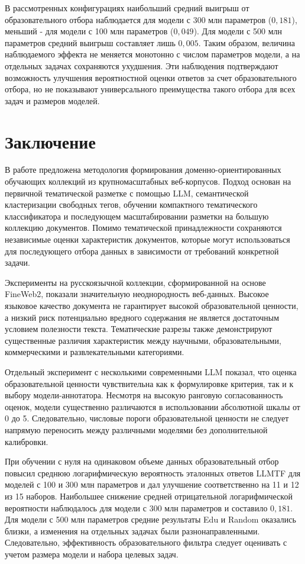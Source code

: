 \documentclass[12pt,a4paper]{article}
\begin{document}
В рассмотренных конфигурациях наибольший средний выигрыш
от образовательного отбора наблюдается для модели с 300 млн параметров
($0{,}181$), меньший - для модели с 100 млн параметров ($0{,}049$).
Для модели с 500 млн параметров средний выигрыш составляет лишь $0{,}005$.
Таким образом, величина наблюдаемого эффекта не меняется монотонно
с числом параметров модели, а на отдельных задачах сохраняются ухудшения.
Эти наблюдения подтверждают возможность улучшения вероятностной оценки
ответов за счет образовательного отбора, но не показывают универсального
преимущества такого отбора для всех задач и размеров моделей.

\section{Заключение}

В работе предложена методология формирования доменно-ориентированных 
обучающих коллекций из крупномасштабных веб-корпусов. Подход основан на 
первичной тематической разметке с помощью LLM, семантической кластеризации 
свободных тегов, обучении компактного тематического классификатора и последующем 
масштабировании разметки на большую коллекцию документов. Помимо тематической 
принадлежности сохраняются независимые оценки характеристик документов, 
которые могут использоваться для последующего отбора данных в зависимости 
от требований конкретной задачи.

Эксперименты на русскоязычной коллекции, сформированной на основе FineWeb2, 
показали значительную неоднородность веб-данных. Высокое языковое качество 
документа не гарантирует высокой образовательной ценности, а низкий риск 
потенциально вредного содержания не является достаточным условием полезности 
текста. Тематические разрезы также демонстрируют существенные различия 
характеристик между научными, образовательными, коммерческими и 
развлекательными категориями.

Отдельный эксперимент с несколькими современными LLM показал, что оценка 
образовательной ценности чувствительна как к формулировке критерия, так и к 
выбору модели-аннотатора. Несмотря на высокую ранговую согласованность оценок, 
модели существенно различаются в использовании абсолютной шкалы от 0 до 5. 
Следовательно, числовые пороги образовательной ценности не следует напрямую 
переносить между различными моделями без дополнительной калибровки.

При обучении с нуля на одинаковом объеме данных образовательный отбор
повысил среднюю логарифмическую вероятность эталонных ответов LLMTF
для моделей с 100 и 300 млн параметров и дал улучшение соответственно
на 11 и 12 из 15 наборов. Наибольшее снижение средней отрицательной
логарифмической вероятности наблюдалось для модели с 300 млн параметров
и составило $0{,}181$.
Для модели с 500 млн параметров средние результаты Edu и Random
оказались близки, а изменения на отдельных задачах были разнонаправленными.
Следовательно, эффективность образовательного фильтра следует оценивать
с учетом размера модели и набора целевых задач.
\end{document}
